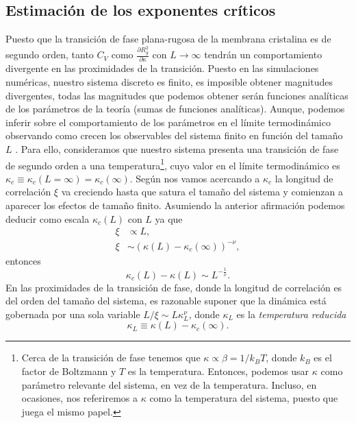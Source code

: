 \subsection{Estimación de los exponentes críticos}

Puesto que la transición de fase plana-rugosa de la membrana cristalina es de
segundo orden, tanto $C_V$ como $\frac{\partial R_g^2}{\partial \kappa}$  con
$L\rightarrow \infty$ tendrán un comportamiento divergente en las proximidades
de la transición. Puesto en las simulaciones numéricas, nuestro sistema
discreto es finito, es imposible obtener magnitudes divergentes, todas las
magnitudes que podemos obtener serán funciones analíticas de los parámetros de
la teoría (sumas de funciones analíticas). Aunque, podemos inferir sobre el
comportamiento de los parámetros en el límite termodinámico observando como
crecen los observables del sistema finito en función del tamaño $L$ \cite{Juan:tesis}. 
Para ello, consideramos que nuestro sistema presenta una transición de fase de
segundo orden a una temperatura\footnote{Cerca de la transición de
  fase tenemos que $\kappa\propto \beta=1/k_BT$, donde $k_B$ es el factor de
  Boltzmann y $T$ es la temperatura. Entonces, podemos usar $\kappa$ como
  parámetro relevante del sistema, en vez de la temperatura. Incluso, en
  ocasiones, nos referiremos a $\kappa$ como la temperatura del sistema,
  puesto que juega el mismo papel.}, cuyo valor en el límite termodinámico es
$\kappa_c\!\equiv\!\kappa_c{\scriptstyle
  (L=\infty)}\!=\!\kappa_c(\infty)$. Según nos vamos acercando a $\kappa_c$ la
longitud de correlación $\xi$ va creciendo hasta que satura el tamaño del
sistema y comienzan a aparecer los efectos de tamaño finito. Asumiendo la
anterior afirmación podemos deducir como escala $\kappa_c(L)$ con $L$ ya que
\begin{align*}
\xi&\propto L,\\ 
\xi&\sim (\kappa(L)-\kappa_c(\infty))^{-\nu},
\end{align*}
entonces
\begin{equation*}
\kappa_c(L)-\kappa(L)\sim L^{-\frac{1}{\nu}}.
\end{equation*}
En las proximidades de la transición de fase, donde la longitud de correlación
es del orden del tamaño del sistema, es razonable suponer que la dinámica está
gobernada por una sola variable $L/\xi\sim L \kappa_L^{\nu}$, donde $\kappa_L$
es la \textit{temperatura reducida}
\begin{equation*}
\kappa_L\equiv \kappa(L)-\kappa_c(\infty).
\end{equation*}
